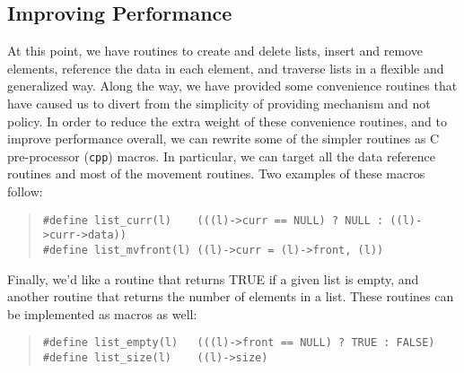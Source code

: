 \documentclass[fullpage,11pt]{article}
\begin{document}
\subsection{Improving Performance}
At this point, we have routines to create and delete lists, insert and remove
elements, reference the data in each element, and traverse lists in a flexible
and generalized way.  Along the way, we have provided some convenience
routines that have caused us to divert from the simplicity of providing
mechanism and not policy.  In order to reduce the extra weight of these
convenience routines, and to improve performance overall, we can rewrite some
of the simpler routines as C pre-processor ({\tt cpp}) macros.  In particular,
we can target all the data reference routines and most of the movement
routines.  Two examples of these macros follow:
\begin{quote}
\begin{verbatim}
#define list_curr(l)    (((l)->curr == NULL) ? NULL : ((l)->curr->data))
#define list_mvfront(l) ((l)->curr = (l)->front, (l))
\end{verbatim}
\end{quote}
Finally, we'd like a routine that returns TRUE if a given list is empty, and
another routine that returns the number of elements in a list.  These
routines can be implemented as macros as well:
\begin{quote}
\begin{verbatim}
#define list_empty(l)   (((l)->front == NULL) ? TRUE : FALSE)
#define list_size(l)    ((l)->size)
\end{verbatim}
\end{quote}
\end{document}
